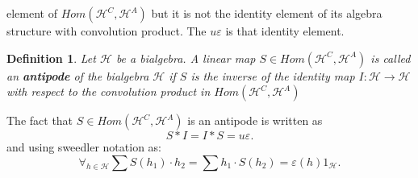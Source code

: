 \documentclass[a4paper, 12pt]{report}
\newtheorem{definition}{Definition}
\begin{document}
element of $Hom(\mathcal{H}^C, \mathcal{H}^A)$ but it is not the identity element of its algebra structure
with convolution product. The $u\varepsilon$ is that identity element.
\begin{definition}
Let $\mathcal{H}$ be a bialgebra. A linear map $S \in Hom(\mathcal{H}^C, \mathcal{H}^A)$ is called an 
\textbf{antipode} of the bialgebra $\mathcal{H}$ if $S$ is the inverse of the identity map 
$I : \mathcal{H} \to \mathcal{H}$ with respect to the convolution product in 
$Hom(\mathcal{H}^C, \mathcal{H}^A)$
\end{definition}
The fact that $S \in Hom(\mathcal{H}^C, \mathcal{H}^A)$ is an antipode is written as
\begin{equation*}
S * I = I * S = u\varepsilon.
\end{equation*}
and using sweedler notation as:
\begin{equation*}
\forall_{h \in \mathcal{H}} \sum S(h_1) \cdot h_2 = \sum h_1 \cdot S(h_2) = \varepsilon(h)1_\mathcal{H}.
\end{equation*}
\end{document}
